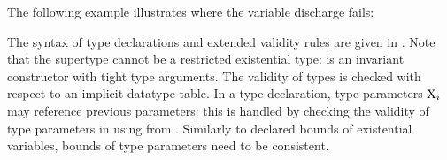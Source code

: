 The following example illustrates  where
the variable discharge fails:\\

The syntax of type declarations and extended validity rules
are given in .
Note that the supertype cannot be a restricted existential type:
 is an invariant constructor with
tight type arguments.
The validity of types is checked with respect to an implicit datatype table.
In a type declaration, type parameters $\mathrm{X}_i$ may reference previous
parameters: this is handled by checking the validity of type parameters
in \tyvld{\TyTable}{\tydecl} using \tyvld{}{\AEnv} from
.
Similarly to declared bounds of existential variables, bounds of type parameters
need to be consistent.


